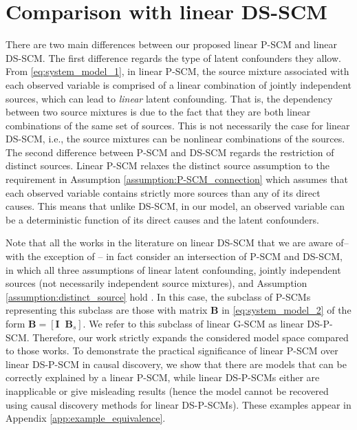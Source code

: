 \documentclass[12pt]{article}
\newcommand{\bB}{\mathbf{B}}
\newcommand{\bI}{\mathbf{I}}
\begin{document}
\section{Comparison with linear DS-SCM} \label{sec:comparison} \vspace{-2mm}
There are two main differences between our proposed linear P-SCM and linear DS-SCM. The first difference regards the type of latent confounders they allow. From \eqref{eq:system_model_1}, in linear P-SCM, the source mixture associated with each observed variable is comprised of a linear combination of jointly independent sources, which can lead to {\it{linear}} latent confounding. That is, the dependency between two source mixtures is due to the fact that they are both linear combinations of the same set of sources.
This is not necessarily the case for linear DS-SCM, i.e., the source mixtures can be nonlinear combinations of the sources.
The second difference between P-SCM and DS-SCM regards the restriction of distinct sources. Linear P-SCM relaxes the distinct source assumption to the requirement in Assumption \ref{assumption:P-SCM_connection} which assumes that each observed variable contains strictly more sources than any of its direct causes. This means that unlike DS-SCM, in our model, an observed variable can be a deterministic function of its direct causes and the latent confounders.

Note that all the works in the literature on linear DS-SCM that we are aware of-- with the exception of \citep{wang2020causal}-- in fact consider an intersection of P-SCM and DS-SCM, in which all three assumptions of linear latent confounding, jointly independent sources (not necessarily independent source mixtures), and Assumption \ref{assumption:distinct_source} hold \citep{hoyer2008estimation,entner2010discovering,tashiro2014parcelingam,salehkaleybar2020learning}. In this case, the subclass of P-SCMs representing this subclass are those with matrix $\bB$ in \eqref{eq:system_model_2} of the form $\bB =[\bI \;\; \bB_{s}]$. We refer to this subclass of linear G-SCM as linear DS-P-SCM. Therefore, our work strictly expands the considered model space compared to those works. %
To demonstrate the practical significance of linear P-SCM over linear DS-P-SCM in causal discovery, we show that there are models that can be correctly explained by a linear P-SCM, while linear DS-P-SCMs either are inapplicable or give misleading results (hence the model cannot be recovered using causal discovery methods for linear DS-P-SCMs). These examples appear in Appendix \ref{app:example_equivalence}.
\end{document}

